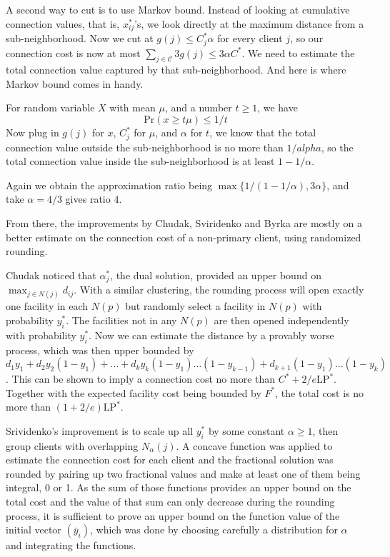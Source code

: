 \documentclass{article}
\newcommand{\cli}{\mathcal{C}}
\newcommand{\LP}{\text{LP}}
\begin{document}
A second way to cut is to use Markov bound. Instead of looking at
cumulative connection values, that is, $x_{ij}^\ast$'s, we look
directly at the maximum distance from a sub-neighborhood. Now we cut
at $g(j) \leq C_j^\ast \alpha$ for every client $j$, so our connection
cost is now at most $\sum_{j\in\cli} 3g(j) \leq 3 \alpha C^\ast$. We
need to estimate the total connection value captured by that
sub-neighborhood. And here is where Markov bound comes in handy.

For random variable $X$ with mean $\mu$, and a number $t\geq 1$, we have
\begin{equation*}
  \text{Pr}(x \geq t\mu) \leq 1/t
\end{equation*}
Now plug in $g(j)$ for $x$, $C_j^\ast$ for $\mu$, and $\alpha$ for
$t$, we know that the total connection value outside the
sub-neighborhood is no more than $1/alpha$, so the total connection
value inside the sub-neighborhood is at least $1-1/\alpha$.

Again we obtain the approximation ratio being $\max\{1/(1-1/\alpha),
3\alpha\}$, and take $\alpha = 4/3$ gives ratio $4$.

From there, the improvements by Chudak, Sviridenko and Byrka are
mostly on a better estimate on the connection cost of a non-primary
client, using randomized rounding.

Chudak noticed that $\alpha_j^\ast$, the dual solution, provided an
upper bound on $\max_{j\in N(j)} d_{ij}$. With a similar clustering,
the rounding process will open exactly one facility in each $N(p)$ but
randomly select a facility in $N(p)$ with probability
$y_{i}^\ast$. The facilities not in any $N(p)$ are then opened
independently with probability $y_i^\ast$. Now we can estimate the
distance by a provably worse process, which was then upper bounded by
$d_1 y_1 + d_2 y_2 (1-y_1) + \ldots + d_k y_k (1-y_1)\ldots(1-y_{k-1})
+ d_{k+1}(1-y_1)\ldots(1-y_k)$. This can be shown to imply a
connection cost no more than $C^\ast + 2/e \LP^\ast$. Together with
the expected facility cost being bounded by $F^\ast$, the total cost
is no more than $(1+2/e)\LP^\ast$.

Srividenko's improvement is to scale up all $y_i^\ast$ by some
constant $\alpha \geq 1$, then group clients with overlapping
$N_\alpha(j)$. A concave function was applied to estimate the
connection cost for each client and the fractional solution was
rounded by pairing up two fractional values and make at least one of
them being integral, 0 or 1. As the sum of those functions provides an
upper bound on the total cost and the value of that sum can only
decrease during the rounding process, it is sufficient to prove an
upper bound on the function value of the initial vector $(\bar y_i)$,
which was done by choosing carefully a distribution for $\alpha$ and
integrating the functions.
\end{document}

